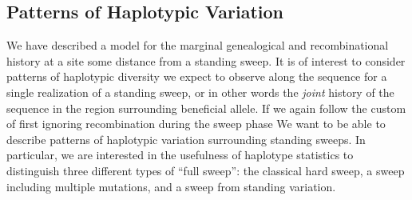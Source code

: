 \documentclass[a4paper,10pt]{article}
\newcommand{\jb}[1]{{\it\color{blue} (#1)} }
\begin{document}


\subsection{Patterns of Haplotypic Variation}

%

We have described a model for the marginal genealogical and recombinational history at a site some distance from a standing sweep. It is of interest to consider patterns of haplotypic diversity we expect to observe along the sequence for a single realization of a standing sweep, or in other words the \textit{joint} history of the sequence in the region surrounding beneficial allele. If we again follow the custom of first ignoring recombination during the sweep phase  We want to be able to describe patterns of haplotypic variation surrounding standing sweeps. In particular, we are interested in the usefulness of haplotype statistics to distinguish three different types of ``full sweep'': the classical hard sweep, a sweep including multiple mutations, and a sweep from standing variation. 
\end{document}
